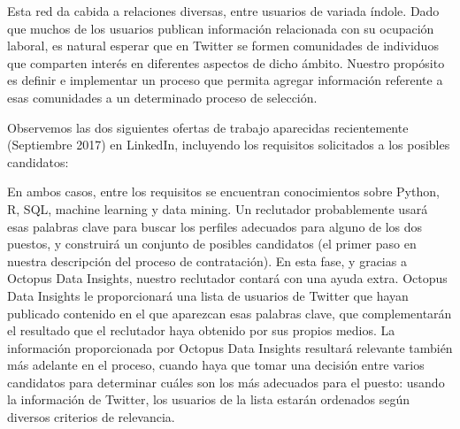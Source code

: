 

Esta red da cabida a relaciones diversas, entre usuarios de variada índole. Dado que muchos de los usuarios 
publican información relacionada con su ocupación laboral, es natural esperar que en Twitter 
se formen comunidades de individuos que comparten interés en diferentes aspectos de dicho ámbito.
Nuestro propósito es definir e implementar un proceso que permita agregar información referente a 
esas comunidades a un determinado proceso de selección.

Observemos las dos siguientes ofertas de trabajo aparecidas recientemente (Septiembre 2017) en LinkedIn,
incluyendo los requisitos solicitados a los posibles candidatos:




En ambos casos, entre los requisitos se encuentran conocimientos sobre Python, R,
SQL, machine learning y data mining. Un reclutador probablemente usará esas palabras clave para buscar
los perfiles adecuados para alguno de los dos puestos, y construirá un conjunto de posibles candidatos (el
primer paso en nuestra descripción del proceso de contratación). En esta fase, y gracias a Octopus Data Insights,
nuestro reclutador contará con una ayuda extra. Octopus Data Insights le proporcionará una lista de usuarios
de Twitter que hayan publicado contenido en el que aparezcan esas palabras clave, que complementarán
el resultado que el reclutador haya obtenido por sus propios medios. La información proporcionada
por Octopus Data Insights resultará relevante también más adelante en el proceso,
cuando haya que tomar una decisión entre varios candidatos para determinar cuáles son los más adecuados para el 
puesto: usando la información de Twitter, los usuarios de la lista estarán ordenados según 
diversos criterios de relevancia.

